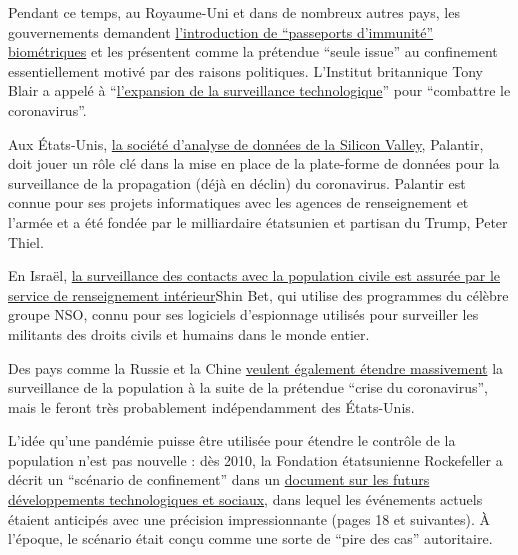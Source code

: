 Pendant ce temps, au Royaume-Uni et dans de nombreux autres pays, les
gouvernements demandent
\href{https://www.msn.com/en-us/money/news/the-uk-just-published-blueprints-for-covid-19-immunity-passports-a-controversial-potential-route-out-of-lockdown/ar-BB13qr8L}{l'introduction
de ``passeports d'immunité'' biométriques} et les présentent comme la
prétendue ``seule issue'' au confinement essentiellement motivé par des
raisons politiques. L'Institut britannique Tony Blair a appelé à
``\href{https://www.theguardian.com/world/2020/apr/24/surveillance-a-price-worth-paying-to-beat-coronavirus-says-blair-thinktank}{l'expansion
de la surveillance technologique}'' pour ``combattre le coronavirus''.

Aux États-Unis,
\href{https://www.msn.com/en-us/news/us/team-trump-turns-to-peter-thiel-s-palantir-to-track-virus/ar-BB130qfE}{la
société d'analyse de données de la Silicon Valley}, Palantir, doit jouer
un rôle clé dans la mise en place de la plate-forme de données pour la
surveillance de la propagation (déjà en déclin) du coronavirus. Palantir
est connue pour ses projets informatiques avec les agences de
renseignement et l'armée et a été fondée par le milliardaire étatsunien
et partisan du Trump, Peter Thiel.

En Israël,
\href{https://www.techdirt.com/articles/20200402/14261944226/controversial-spyware-vendor-nso-group-is-helping-israeli-government-spy-own-citizens.shtml}{la
surveillance des contacts avec la population civile est assurée par le
service de renseignement intérieur}Shin Bet, qui utilise des programmes
du célèbre groupe NSO, connu pour ses logiciels d'espionnage utilisés
pour surveiller les militants des droits civils et humains dans le monde
entier.

Des pays comme la Russie et la Chine
\href{https://www.npr.org/sections/coronavirus-live-updates/2020/04/01/825329399/moscow-launches-new-surveillance-app-to-track-residents-in-coronavirus-lockdown}{veulent
également étendre massivement} la surveillance de la population à la
suite de la prétendue ``crise du coronavirus'', mais le feront très
probablement indépendamment des États-Unis.

L'idée qu'une pandémie puisse être utilisée pour étendre le contrôle de
la population n'est pas nouvelle : dès 2010, la Fondation étatsunienne
Rockefeller a décrit un ``scénario de confinement'' dans un
\href{https://swprs.files.wordpress.com/2020/04/rockefeller-foundation-scenarios-2010.pdf}{document
sur les futurs développements technologiques et sociaux}, dans lequel
les événements actuels étaient anticipés avec une précision
impressionnante (pages 18 et suivantes). À l'époque, le scénario était
conçu comme une sorte de ``pire des cas'' autoritaire.


